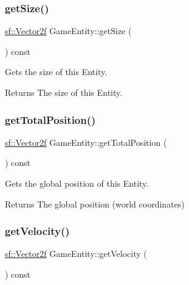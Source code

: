 \subsubsection{\texorpdfstring{getSize()}{getSize()}}
{\footnotesize\ttfamily \mbox{\hyperlink{classsf_1_1_vector2}{sf\+::\+Vector2f}} Game\+Entity\+::get\+Size (\begin{DoxyParamCaption}{ }\end{DoxyParamCaption}) const\hspace{0.3cm}{\ttfamily [inline]}}



Gets the size of this Entity. 

\begin{DoxyReturn}{Returns}
The size of this Entity. 
\end{DoxyReturn}
\mbox{\label{class_game_entity_a943f5b9f20bd540c273f2570c4d238c6}} 
\subsubsection{\texorpdfstring{getTotalPosition()}{getTotalPosition()}}
{\footnotesize\ttfamily \mbox{\hyperlink{classsf_1_1_vector2}{sf\+::\+Vector2f}} Game\+Entity\+::get\+Total\+Position (\begin{DoxyParamCaption}{ }\end{DoxyParamCaption}) const\hspace{0.3cm}{\ttfamily [inline]}}



Gets the global position of this Entity. 

\begin{DoxyReturn}{Returns}
The global position (world coordinates) 
\end{DoxyReturn}
\mbox{\label{class_game_entity_afe5c1a38c4546dfda67458f852e89d92}} 
\subsubsection{\texorpdfstring{getVelocity()}{getVelocity()}}
{\footnotesize\ttfamily \mbox{\hyperlink{classsf_1_1_vector2}{sf\+::\+Vector2f}} Game\+Entity\+::get\+Velocity (\begin{DoxyParamCaption}{ }\end{DoxyParamCaption}) const\hspace{0.3cm}{\ttfamily [inline]}}



